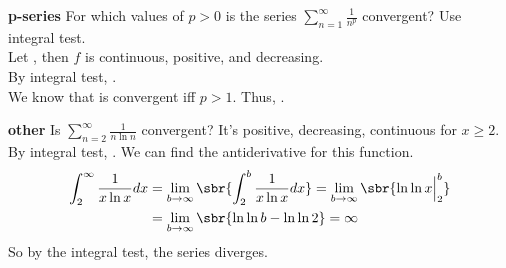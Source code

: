 \documentclass[../13.tex]{subfiles}
\begin{document}
\textbf{p-series}
For which values of \(p > 0\) is the series \(\sum_{n = 1}^{\infty} \frac{1}{n^p}\) convergent? Use integral test. \\
Let , then \(f\) is continuous, positive, and decreasing. \\
By integral test, . \\
We know that  is convergent iff \(p > 1\). Thus, .

\textbf{other}
Is \(\sum_{n = 2}^{\infty} \frac{1}{n\ln n}\) convergent? It's positive, decreasing, continuous for \(x \geq 2\). \\
By integral test, . We can find the antiderivative for this function.
\begin{align*}
    \int_{2}^{\infty} {\frac{1}{x\ln x}} dx & = \lim_{b\to\infty} \sbr{\int_{2}^{b} {\frac{1}{x\ln x}} dx } = \lim_{b\to\infty} \sbr{\ln\ln x \Big\vert_2^b} \\
                                            & = \lim_{b\to\infty} \sbr{\ln\ln b - \ln\ln 2} = \infty
\end{align*}
So by the integral test, the series diverges.
\newpage
\end{document}
